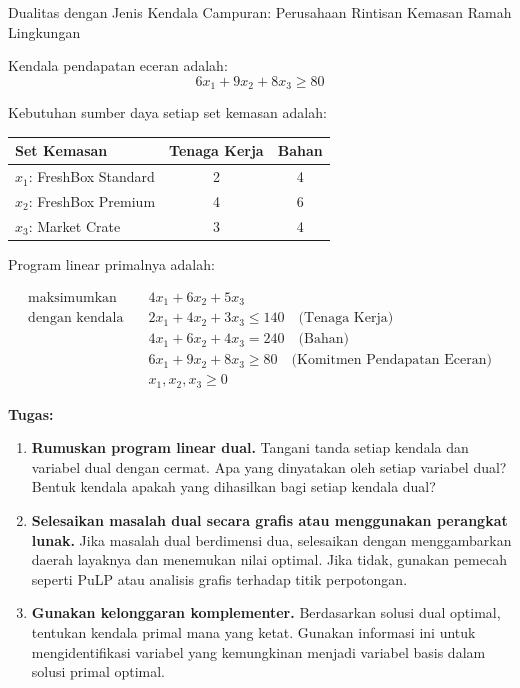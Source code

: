 \begin{ex}{Dualitas dengan Jenis Kendala Campuran: Perusahaan Rintisan Kemasan Ramah Lingkungan}{}
\begin{center}
\end{center}

Kendala pendapatan eceran adalah:
\[
6x_1 + 9x_2 + 8x_3 \geq 80
\]

Kebutuhan sumber daya setiap set kemasan adalah:

\begin{center}
\begin{tabular}{|l|c|c|}
\hline
Set Kemasan & Tenaga Kerja & Bahan \\
\hline
$x_1$: FreshBox Standard & 2 & 4 \\
$x_2$: FreshBox Premium & 4 & 6 \\
$x_3$: Market Crate & 3 & 4 \\
\hline
\end{tabular}
\par{}\label{tab:complimentary-slackness-tab05}%

\end{center}

Program linear primalnya adalah:

\[
\begin{aligned}
\text{maksimumkan} \quad & 4x_1 + 6x_2 + 5x_3 \\
\text{dengan kendala} \quad
& 2x_1 + 4x_2 + 3x_3 \leq 140 \quad \text{(Tenaga Kerja)} \\
& 4x_1 + 6x_2 + 4x_3 = 240 \quad \text{(Bahan)} \\
& 6x_1 + 9x_2 + 8x_3 \geq 80 \quad \text{(Komitmen Pendapatan Eceran)} \\
& x_1, x_2, x_3 \geq 0
\end{aligned}
\]

\textbf{Tugas:}

\begin{enumerate}
  \item \textbf{Rumuskan program linear dual.}
  Tangani tanda setiap kendala dan variabel dual dengan cermat. Apa yang dinyatakan oleh setiap variabel dual? Bentuk kendala apakah yang dihasilkan bagi setiap kendala dual?

  \item \textbf{Selesaikan masalah dual secara grafis atau menggunakan perangkat lunak.}
  Jika masalah dual berdimensi dua, selesaikan dengan menggambarkan daerah layaknya dan menemukan nilai optimal. Jika tidak, gunakan pemecah seperti PuLP atau analisis grafis terhadap titik perpotongan.

  \item \textbf{Gunakan kelonggaran komplementer.}
  Berdasarkan solusi dual optimal, tentukan kendala primal mana yang ketat. Gunakan informasi ini untuk mengidentifikasi variabel yang kemungkinan menjadi variabel basis dalam solusi primal optimal.


\end{enumerate}
\end{ex}

